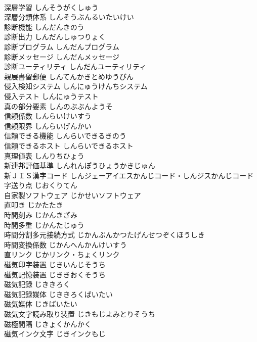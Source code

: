 \documentclass[8pt]{extreport}
\begin{document}
\begin{CJK}{UTF8}{min}
\\	深層学習	しんそうがくしゅう	
\\	深層分類体系	しんそうぶんるいたいけい	
\\	診断機能	しんだんきのう	
\\	診断出力	しんだんしゅつりょく	
\\	診断プログラム	しんだんプログラム	
\\	診断メッセージ	しんだんメッセージ	
\\	診断ユーティリティ	しんだんユーティリティ	
\\	親展書留郵便	しんてんかきとめゆうびん	
\\	侵入検知システム	しんにゅうけんちシステム	
\\	侵入テスト	しんにゅうテスト	
\\	真の部分要素	しんのぶぶんようそ	
\\	信頼係数	しんらいけいすう	
\\	信頼限界	しんらいげんかい	
\\	信頼できる機能	しんらいできるきのう	
\\	信頼できるホスト	しんらいできるホスト	
\\	真理値表	しんりちひょう	
\\	新連邦評価基準	しんれんぽうひょうかきじゅん	
\\	新ＪＩＳ漢字コード	しんジェーアイエスかんじコード・しんジスかんじコード	
\\	字送り点	じおくりてん	
\\	自家製ソフトウェア	じかせいソフトウェア	
\\	直叩き	じかたたき	
\\	時間刻み	じかんきざみ	
\\	時間多重	じかんたじゅう	
\\	時間分割多元接続方式	じかんぶんかつたげんせつぞくほうしき	
\\	時間変換係数	じかんへんかんけいすう	
\\	直リンク	じかリンク・ちょくリンク	
\\	磁気印字装置	じきいんじそうち	
\\	磁気記憶装置	じききおくそうち	
\\	磁気記録	じききろく	
\\	磁気記録媒体	じききろくばいたい	
\\	磁気媒体	じきばいたい	
\\	磁気文字読み取り装置	じきもじよみとりそうち	
\\	磁極間隔	じきょくかんかく	
\\	磁気インク文字	じきインクもじ	

\end{CJK}
\end{document}

